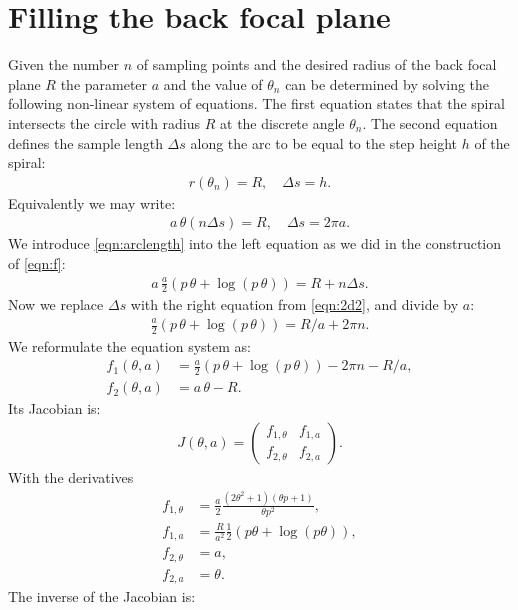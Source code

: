 \documentclass[twocolumn,DIV18]{scrartcl}
\renewcommand{\(}{\left(}
\renewcommand{\)}{\right)}
\begin{document}
\section{Filling the back focal plane}
Given the number $n$ of sampling points and the desired radius of the
back focal plane $R$ the parameter $a$ and the value of $\theta_n$ can
be determined by solving the following non-linear system of
equations. The first equation states that the spiral intersects the
circle with radius $R$ at the discrete angle $\theta_n$. The second
equation defines the sample length $\Delta s$ along the arc to be
equal to the step height $h$ of the spiral:
\begin{align}
  r(\theta_n)=R, \quad \Delta s=h.
\end{align}
Equivalently we may write:
\begin{align} \label{eqn:2d2}
  a \, \theta(n \Delta s)=R, \quad \Delta s=2\pi a.
\end{align}
We introduce \eqref{eqn:arclength} into the left equation as we did in
the construction of \eqref{eqn:f}:
\begin{align}
  a \, \frac{a}{2} \(p\,\theta+\log(p\,\theta)\) = R+n\Delta s. 
\end{align}
Now we replace $\Delta s$ with the right equation from
\eqref{eqn:2d2}, and divide by $a$:
\begin{align}
  \frac{a}{2} \(p\,\theta+\log(p\,\theta)\) = R/a +2\pi n. 
\end{align}
We reformulate the equation system as:
\begin{align}
  f_1(\theta,a)&=\frac{a}{2}\(p\,\theta+\log(p\,\theta)\)-2\pi n-R/a,\\
  f_2(\theta,a)&=a\,\theta-R. 
\end{align}
Its Jacobian is:
\begin{align}
  J(\theta,a)=\begin{pmatrix}
  f_{1,\theta} & f_{1,a} \\
  f_{2,\theta} & f_{2,a}
\end{pmatrix}.
\end{align}
With the derivatives
\begin{align}
  f_{1,\theta}&=\frac{a}{2}\frac{(2\theta^2+1)(\theta p + 1)}{\theta p^2},\\ 
  f_{1,a}&=\frac{R}{a^2}\frac{1}{2}\(p\theta+\log(p\theta)\), \\
  f_{2,\theta}&=a, \\
  f_{2,a}&=\theta.
\end{align}
The inverse of the Jacobian is:
\end{document}
